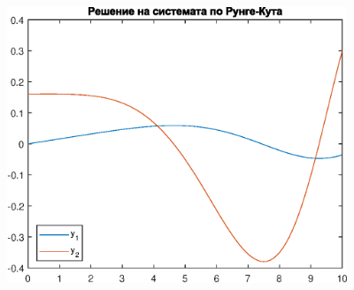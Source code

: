 \documentclass[a4paper,fleqn,12pt]{article}
\begin{document}
\begin{center}
\includegraphics [width=4in]{firstTask_01.eps}
\end{center}

\newpage
\end{document}
